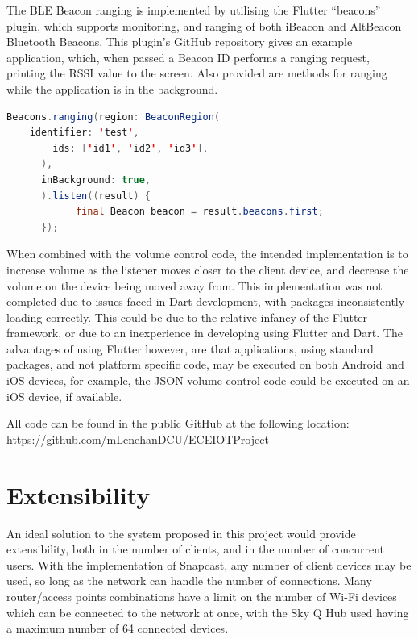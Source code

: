 \documentclass[11pt,a4paper,headinclude=false,footinclude=false]{scrreprt}
\begin{document}
The BLE Beacon ranging is implemented by utilising the Flutter
``beacons'' plugin, which supports monitoring, and ranging of both
iBeacon and AltBeacon Bluetooth Beacons\cite{flutterBeacons}. This
plugin's GitHub repository gives an example application, which, when
passed a Beacon ID performs a ranging request, printing the RSSI value
to the screen. Also provided are methods for ranging while the
application is in the background.

\lstset{
    caption=Flutter Beacons Generic Beacon Ranging,
    basicstyle=\footnotesize, frame=tb,
    xleftmargin=.2\textwidth, xrightmargin=.2\textwidth
}

\begin{lstlisting}[language=Java]
Beacons.ranging(region: BeaconRegion(
    identifier: 'test',
        ids: ['id1', 'id2', 'id3'],
      ),
      inBackground: true,
      ).listen((result) {
            final Beacon beacon = result.beacons.first;
      });
\end{lstlisting}

When combined with the volume control code, the intended implementation
is to increase volume as the listener moves closer to the client device,
and decrease the volume on the device being moved away from. This
implementation was not completed due to issues faced in Dart
development, with packages inconsistently loading correctly. This could
be due to the relative infancy of the Flutter framework, or due to an
inexperience in developing using Flutter and Dart. The advantages of
using Flutter however, are that applications, using standard packages,
and not platform specific code, may be executed on both Android and iOS
devices, for example, the JSON volume control code could be executed on
an iOS device, if available.

All code can be found in the public GitHub at the following location:
\url{https://github.com/mLenehanDCU/ECEIOTProject}

\section{Extensibility}\label{extensibility}

An ideal solution to the system proposed in this project would provide
extensibility, both in the number of clients, and in the number of
concurrent users. With the implementation of Snapcast, any number of
client devices may be used, so long as the network can handle the number
of connections. Many router/access points combinations have a limit on
the number of Wi-Fi devices which can be connected to the network at
once, with the Sky Q Hub used having a maximum number of 64 connected
devices\cite{SkyQ}.
\end{document}
